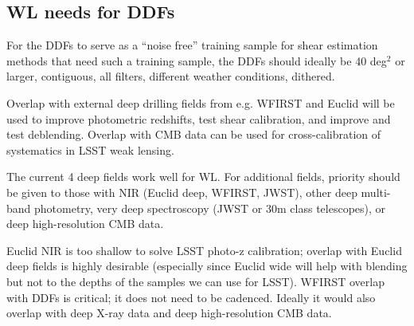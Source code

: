 \subsection{WL needs for DDFs}

For the DDFs to serve as a ``noise free'' training sample for shear estimation methods that need
such a training sample, the DDFs should ideally be 40 deg$^2$ or larger, contiguous, all filters,
different weather conditions, dithered.

Overlap with external deep drilling fields from e.g. WFIRST and Euclid will be used to improve
photometric redshifts, test shear calibration, and improve and test deblending. Overlap with CMB
data can be used for cross-calibration of systematics in LSST weak lensing. 

The current 4 deep fields work well for WL.  For additional fields, priority should be given to
those with NIR (Euclid deep, WFIRST, JWST), other deep multi-band photometry, very deep
spectroscopy (JWST or 30m class telescopes), or deep high-resolution CMB data.

Euclid NIR is too shallow to solve LSST photo-z calibration; overlap with Euclid deep fields is
highly desirable (especially since Euclid wide will help with blending but not to the depths of the
samples we can use for LSST). WFIRST overlap with DDFs is critical; it does not need to be cadenced.  Ideally it would also overlap with
deep X-ray data and deep high-resolution CMB data.

